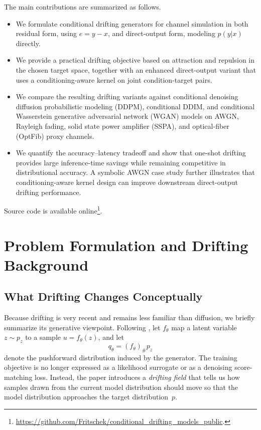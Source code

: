 \documentclass[conference]{IEEEtran}
\begin{document}
The main contributions are summarized as follows.
\begin{itemize}
\item We formulate conditional drifting generators for channel simulation in both residual form,
  using \(e = y - x\), and direct-output form, modeling \(p(y | x)\) directly.
\item We provide a practical drifting objective based on attraction and repulsion in the chosen target space, together with an enhanced direct-output variant that uses a conditioning-aware kernel on joint condition-target pairs.
\item We compare the resulting drifting variants against conditional denoising
diffusion probabilistic modeling (DDPM), conditional DDIM, and conditional Wasserstein
generative adversarial network (WGAN) models \cite{wgan} on AWGN, Rayleigh fading, solid state power amplifier (SSPA), and optical-fiber (OptFib) proxy channels.
\item We quantify the accuracy--latency tradeoff and show that one-shot drifting provides large inference-time savings while remaining competitive in distributional accuracy. A symbolic AWGN case study further illustrates that conditioning-aware kernel design can improve downstream direct-output drifting performance.
\end{itemize}
Source code is available online\footnote{\url{https://github.com/Fritschek/conditional_drifting_models_public}.}.

\section{Problem Formulation and Drifting Background}
\subsection{What Drifting Changes Conceptually}
Because drifting is very recent and remains less familiar than diffusion, we briefly summarize its generative viewpoint.
Following \cite{drifting}, let \(f_\theta\) map a latent variable \(z \sim p_z\) to a sample \(u = f_\theta(z)\), and let
\begin{equation}
q_\theta = (f_\theta)_\# p_z
\end{equation}
denote the pushforward distribution induced by the generator.
The training objective is no longer expressed as a likelihood surrogate or as a denoising score-matching loss.
Instead, the paper introduces a \emph{drifting field} that tells us how samples drawn from the current model distribution should move so that the model distribution approaches the target distribution~\(p\).
\end{document}
